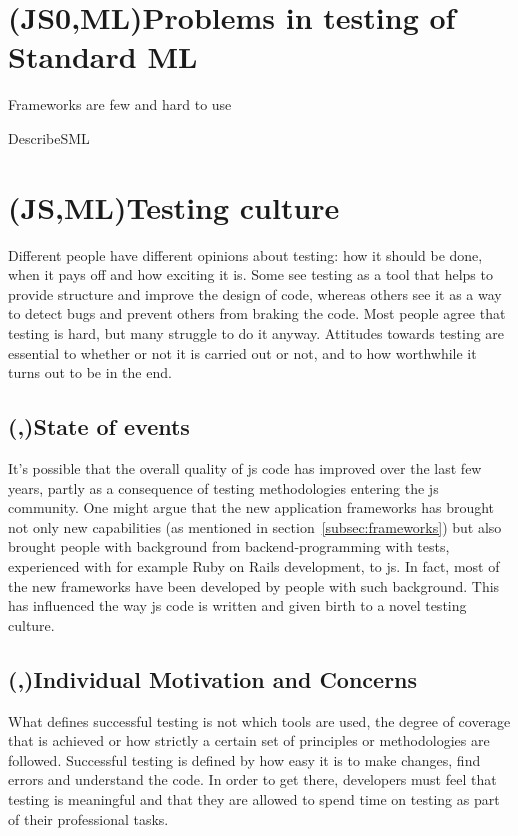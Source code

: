 \documentclass[11pt]{article}
\begin{document}
\section{(JS0,ML)Problems in testing of Standard ML}

Frameworks are few and hard to use

DescribeSML


\section{(JS,ML)Testing culture}
\label{sec:testingculture}

Different people have different opinions about testing: how it should be done, when it pays off and how exciting it is. Some see testing as a tool that helps to provide structure and improve the design of code, whereas others see it as a way to detect bugs and prevent others from braking the code. Most people agree that testing is hard, but many struggle to do it anyway. Attitudes towards testing are essential to whether or not it is carried out or not, and to how worthwhile it turns out to be in the end.

\subsection{(,)State of events}
\label{subsec:stateofevents}

It's possible that the overall quality of \gls{js} code has improved over the last few years, partly as a consequence of testing methodologies entering the \gls{js} community. One might argue that the new application frameworks has brought not only new capabilities (as mentioned in section~\ref{subsec:frameworks}) but also brought people with background from backend-programming with tests, experienced with for example Ruby on Rails development, to \gls{js}. In fact, most of the new frameworks have been developed by people with such background. This has influenced the way \gls{js} code is written and given birth to a novel testing culture. \cite[questions~12-15]{Ahnve}

\subsection{(,)Individual Motivation and Concerns}
\label{subsec:motivationconcerns}

What defines successful testing is not which tools are used, the degree of coverage that is achieved or how strictly a certain set of principles or methodologies are followed. Successful testing is defined by how easy it is to make changes, find errors and understand the code. In order to get there, developers must feel that testing is meaningful and that they are allowed to spend time on testing as part of their professional tasks.
\end{document}
